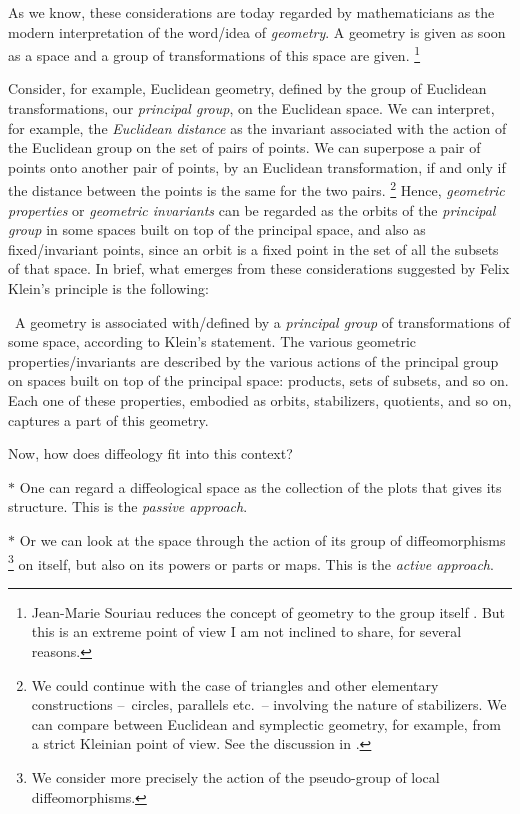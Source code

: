 As we know,
these considerations are today regarded by mathematicians as the modern interpretation of the word/idea of \emph{geometry}.
A geometry is given as soon as a space and a group of transformations of this space are given.%
\footnote{Jean-Marie Souriau reduces the concept of geometry to the group itself \cite{Sou03}.
But this is an extreme point of view I am not inclined to share,
for several reasons.}

Consider,
for example,
Euclidean geometry,
defined by the group of Euclidean transformations,
our {\em principal group},
on the Euclidean space.
We can interpret,
for example,
the {\em Euclidean distance} as the invariant associated with the action of the Euclidean group on the set of pairs of points.
We can superpose a pair of points onto another pair of points,
by an Euclidean transformation,
if and only if the distance between the points is the same for the two pairs.%
\footnote{We could continue with the case of triangles and other elementary constructions
--~circles,
parallels etc.~--
involving the nature of stabilizers.
We can compare between Euclidean and symplectic geometry,
for example,
from a strict Kleinian point of view.
See the discussion in \cite{PIZ02}.}
Hence,
{\em geometric properties} or {\em geometric invariants} can be regarded as the orbits of the {\em principal group} in some spaces built on top of the principal space,
and also as fixed/invariant points,
since an orbit is a fixed point in the set of all the subsets of that space.
In brief,
what emerges from these considerations suggested by Felix Klein's principle is the following:

~A geometry is associated with/defined by a {\em principal group} of transformations of some space,
according to Klein's statement.
The various geometric properties/invariants are described by the various actions of the principal group on spaces built on top of the principal space:
products,
sets of subsets,
and so on.
Each one of these properties,
embodied as orbits,
stabilizers,
quotients,
and so on,
captures a part of this geometry.

Now,
how does diffeology fit into this context?

$*$ One can regard a diffeological space as the collection of the plots that gives its structure.
This is the {\em passive approach}.

$*$ Or we can look at the space through the action of its group of diffeomorphisms%
\footnote{We consider more precisely the action of the pseudo-group of local diffeomorphisms.}
on itself,
but also on its powers or parts or maps.
This is the {\em active approach}.

